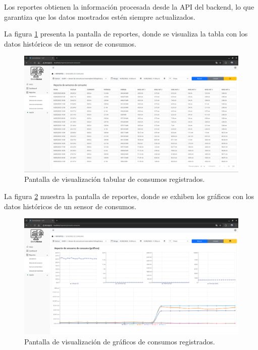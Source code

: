 Los reportes obtienen la información procesada desde la API del backend, lo que
garantiza que los datos mostrados estén siempre actualizados.

La figura \ref{fig:reportes_tabla_consumos} presenta la pantalla de reportes,
donde se visualiza la tabla con los datos históricos de un sensor de consumos.

\begin{figure}[H]
    \centering
    \includegraphics[width=\textwidth]{./Images/28_reportes_1.png}
    \caption{Pantalla de visualización tabular de consumos registrados.}
    \label{fig:reportes_tabla_consumos}
\end{figure}

La figura \ref{fig:reportes_graficos_consumos} muestra la pantalla de reportes,
donde se exhiben los gráficos con los datos históricos de un sensor de
consumos.

\begin{figure}[H]
    \centering
    \includegraphics[width=\textwidth]{./Images/28_reportes_2.png}
    \caption{Pantalla de visualización de gráficos de consumos registrados.}
    \label{fig:reportes_graficos_consumos}
\end{figure}

